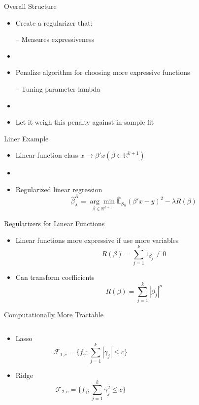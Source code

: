\documentclass{beamer}
\begin{document}
\begin{frame}{Overall Structure}
	\begin{itemize}
		\item Create a regularizer that:
		
		– Measures expressiveness
		\item[]
		\item Penalize algorithm for choosing more expressive functions
		
		– Tuning parameter lambda
		\item[]		
		\item Let it weigh this penalty against in-sample fit
	\end{itemize}
\end{frame}

\begin{frame}{Liner Example}
	\begin{itemize}
		\item Linear function class $x \rightarrow \beta'x (\beta \in \mathbb{R}^{k+1})$
		\item[]
		\item Regularized linear regression
		$$\hat{\beta}_\lambda^R=\underset{\beta \in \mathbb{R}^{k+1}}{\arg\min}\hat{\mathbb{E}}_{S_n}(\beta'x-y)^2-\lambda R(\beta)$$
	\end{itemize}
\end{frame}

\begin{frame}{Regularizers for Linear Functions}
	\begin{itemize}
		\item Linear functions more expressive if use more variables
		$$R(\beta)=\sum_{j=1}^{k}1_{\beta_j}\neq 0$$
		
		\item Can transform coefficients
		$$R(\beta)=\sum_{j=1}^{k}|\beta_j|^p$$
	\end{itemize}
\end{frame}

\begin{frame}{Computationally More Tractable}
	\begin{columns}
		\begin{column}{0.4\textwidth}
		\begin{itemize}
		\item Lasso
		$$\mathcal{F}_{1,c}=\{f_\gamma; \sum_{j=1}^{k}|\gamma_j|\leq c\}$$
		\item Ridge
		$$\mathcal{F}_{2,c}=\{f_\gamma; \sum_{j=1}^{k} \gamma_j^2\leq c\}$$
		\end{itemize}
		\end{column}
		
		\begin{column}{0.6\textwidth}
		\end{column}
	\end{columns}
\end{frame}
\end{document}
